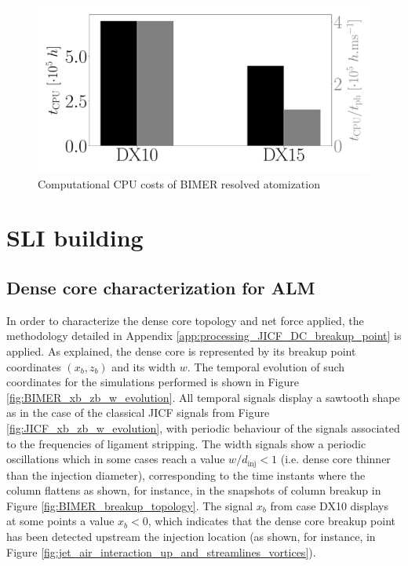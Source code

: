 \begin{figure}[ht]
	\centering
	\includegraphics[scale=0.22]{./part3_applications/figures_ch8_resolved/SLI_cost_for_convergence/cost_all_simulations}
	\vspace*{-0.1in}
   \caption{Computational CPU costs of BIMER resolved atomization}
\label{fig:ch8_sli_cost_bar_graphs}
\end{figure}

\vspace*{-0.3in}

\section{SLI building}
\label{sec:ch8_SLI_building}

\subsection{Dense core characterization for ALM}
\label{subsec:ch8_BIMER_DC_characterization}


In order to characterize the dense core topology and net force applied, the methodology detailed in Appendix \ref{app:processing_JICF_DC_breakup_point} is applied. As explained, the dense core is represented by its breakup point coordinates $\left( x_b, z_b \right)$ and its width $w$. The temporal evolution of such coordinates for the simulations performed is shown in Figure \ref{fig:BIMER_xb_zb_w_evolution}. All temporal signals display a sawtooth shape as in the case of the classical JICF signals from Figure 
\ref{fig:JICF_xb_zb_w_evolution}, with periodic behaviour of the signals associated to the frequencies of ligament stripping. The width signals show a periodic oscillations which in some cases reach a value $w/d_\mathrm{inj} < 1$ (i.e. dense core thinner than the injection diameter), corresponding to the time instants where the column flattens as shown, for instance, in the snapshots of column breakup in Figure \ref{fig:BIMER_breakup_topology}. The signal $x_b$ from case DX10 displays at some points a value $x_b < 0$, which indicates that the dense core breakup point has been detected upstream the injection location (as shown, for instance, in Figure \ref{fig:jet_air_interaction_up_and_streamlines_vortices}).

